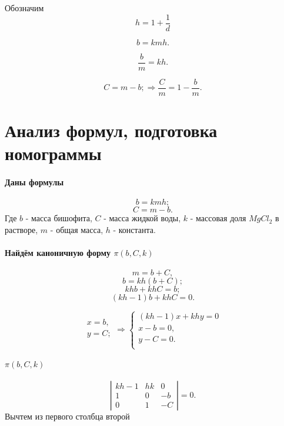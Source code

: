Обозначим $$ h= 1 + \frac{1}{d}$$

$$b = k m h.$$

$$\frac{b}{m} = k h.$$

$$C = m - b; \Rightarrow \frac{C}{m} = 1 - \frac{b}{m}.$$

\section{Анализ формул, подготовка номограммы}

\paragraph{Даны формулы}
$$b = k m h;$$
$$C = m - b.$$
Где $b$ - масса бишофита, $C$ - масса жидкой воды, $k$ - массовая доля $MgCl_2$ в растворе, $m$ - общая масса, $h$ - константа.

\paragraph{Найдём каноничную форму $\pi(b, C, k)$}
$$m = b + C,$$
$$b = kh \left( b+ C \right);$$
$$kh b + kh C = b;$$
$$\left(kh -1\right) b + kh C = 0.$$

$$
\begin{array}{l}
x = b,\\
y = C;\\
\end{array}
\Rightarrow
\left\{
	\begin{array}{l}
		\left(kh -1\right) x + kh y = 0 \\
		x - b = 0,\\
		y - C = 0.\\
	\end{array}
\right.
$$

\paragraph{$\pi(b, C, k)$}
$$
\left|
\begin{array}{lll}
	kh -1 & hk & 0 \\
	1 & 0 & -b \\
	0 & 1 & -C
\end{array}
\right|
=0.
$$
Вычтем из первого столбца второй

